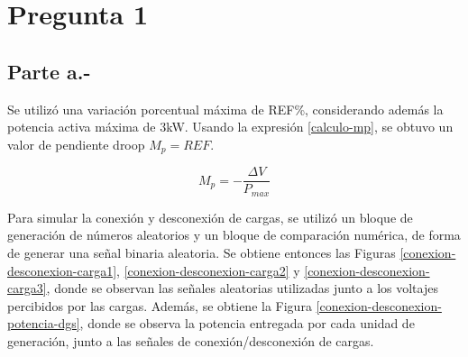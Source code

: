 %
%


\newcommand{\explorelite}{\textit{explore\_lite}}
\newcommand{\movebase}{\textit{move\_base}}



\section{Pregunta 1}

\subsection{Parte a.-}

Se utilizó una variación porcentual máxima de REF\%, considerando además la potencia activa máxima de 3kW. Usando la expresión \ref{calculo-mp}, se obtuvo un valor de pendiente droop $M_p = REF$. 

\begin{equation}
    M_p = -\frac{\Delta V}{P_{max}}
    \label{calculo-mp}
\end{equation}

Para simular la conexión y desconexión de cargas, se utilizó un bloque de generación de números aleatorios y un bloque de comparación numérica, de forma de generar una señal binaria aleatoria. Se obtiene entonces las Figuras \ref{conexion-desconexion-carga1}, \ref{conexion-desconexion-carga2} y \ref{conexion-desconexion-carga3}, donde se observan las señales aleatorias utilizadas junto a los voltajes percibidos por las cargas. Además, se obtiene la Figura \ref{conexion-desconexion-potencia-dgs}, donde se observa la potencia entregada por cada unidad de generación, junto a las señales de conexión/desconexión de cargas.

